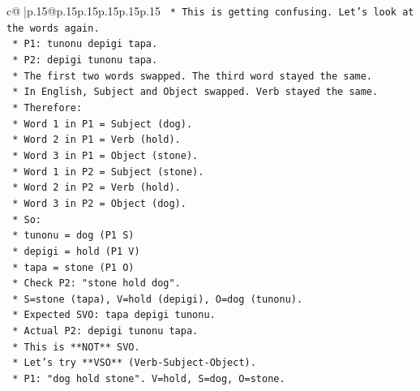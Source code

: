 \documentclass{article}
\begin{document}
{\begin{supertabular}{c@{$\;$}|p{.15\linewidth}@{}p{.15\linewidth}p{.15\linewidth}p{.15\linewidth}p{.15\linewidth}p{.15\linewidth}}
{{{\texttt{                            *   This is getting confusing. Let's look at the words again.} \\
\texttt{                            *   P1: tunonu depigi tapa.} \\
\texttt{                            *   P2: depigi tunonu tapa.} \\
\texttt{                            *   The first two words swapped. The third word stayed the same.} \\
\texttt{                            *   In English, Subject and Object swapped. Verb stayed the same.} \\
\texttt{                            *   Therefore:} \\
\texttt{                                *   Word 1 in P1 = Subject (dog).} \\
\texttt{                                *   Word 2 in P1 = Verb (hold).} \\
\texttt{                                *   Word 3 in P1 = Object (stone).} \\
\texttt{                                *   Word 1 in P2 = Subject (stone).} \\
\texttt{                                *   Word 2 in P2 = Verb (hold).} \\
\texttt{                                *   Word 3 in P2 = Object (dog).} \\
\texttt{                            *   So:} \\
\texttt{                                *   tunonu = dog (P1 S)} \\
\texttt{                                *   depigi = hold (P1 V)} \\
\texttt{                                *   tapa = stone (P1 O)} \\
\texttt{                                *   Check P2: "stone hold dog".} \\
\texttt{                                *   S=stone (tapa), V=hold (depigi), O=dog (tunonu).} \\
\texttt{                                *   Expected SVO: tapa depigi tunonu.} \\
\texttt{                                *   Actual P2: depigi tunonu tapa.} \\
\texttt{                                *   This is **NOT** SVO.} \\
\texttt{                                *   Let's try **VSO** (Verb{-}Subject{-}Object).} \\
\texttt{                                    *   P1: "dog hold stone". V=hold, S=dog, O=stone.} \\
}}}
\end{supertabular}}
\end{document}

